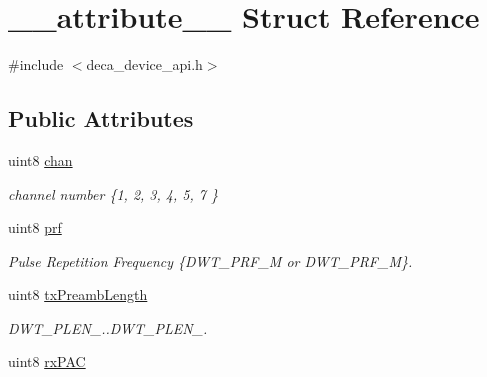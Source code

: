 \hypertarget{struct____attribute____}{\section{\-\_\-\-\_\-attribute\-\_\-\-\_\- Struct Reference}
\label{struct____attribute____}
}


{\ttfamily \#include $<$deca\-\_\-device\-\_\-api.\-h$>$}

\subsection*{Public Attributes}
\begin{DoxyCompactItemize}
\item 
\hypertarget{struct____attribute_____a20a7b913c8dfb5be80023b841176d05f}{uint8 \hyperlink{struct____attribute_____a20a7b913c8dfb5be80023b841176d05f}{chan}}\label{struct____attribute_____a20a7b913c8dfb5be80023b841176d05f}

\begin{DoxyCompactList}\small\item\em channel number \{1, 2, 3, 4, 5, 7 \} \end{DoxyCompactList}\item 
\hypertarget{struct____attribute_____a5238e5258ebbefdb7dbb86ac3cdd0f4b}{uint8 \hyperlink{struct____attribute_____a5238e5258ebbefdb7dbb86ac3cdd0f4b}{prf}}\label{struct____attribute_____a5238e5258ebbefdb7dbb86ac3cdd0f4b}

\begin{DoxyCompactList}\small\item\em Pulse Repetition Frequency \{D\-W\-T\-\_\-\-P\-R\-F\-\_\-M or D\-W\-T\-\_\-\-P\-R\-F\-\_\-M\}. \end{DoxyCompactList}\item 
\hypertarget{struct____attribute_____ab9e9b71798b62778e46a206f5728a198}{uint8 \hyperlink{struct____attribute_____ab9e9b71798b62778e46a206f5728a198}{tx\-Preamb\-Length}}\label{struct____attribute_____ab9e9b71798b62778e46a206f5728a198}

\begin{DoxyCompactList}\small\item\em D\-W\-T\-\_\-\-P\-L\-E\-N\-\_..D\-W\-T\-\_\-\-P\-L\-E\-N\-\_. \end{DoxyCompactList}\item 
\hypertarget{struct____attribute_____a305dbcf360938faa398cc0cb3c7054a9}{uint8 \hyperlink{struct____attribute_____a305dbcf360938faa398cc0cb3c7054a9}{rx\-P\-A\-C}}\label{struct____attribute_____a305dbcf360938faa398cc0cb3c7054a9}


\end{DoxyCompactItemize}
